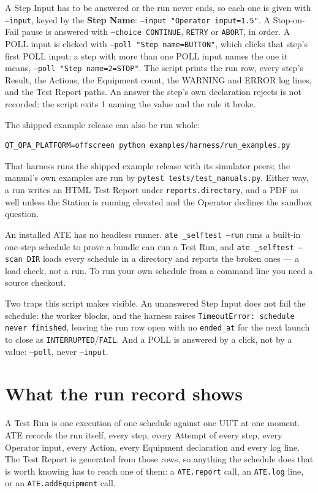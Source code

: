 A Step Input has to be answered or the run never ends, so each one is given with
\texttt{--input}, keyed by the \textbf{Step Name}: \texttt{--input "Operator input=1.5"}. A
Stop-on-Fail pause is answered with \texttt{--choice CONTINUE}, \texttt{RETRY} or
\texttt{ABORT}, in order. A POLL input is clicked with \texttt{--poll "Step name=BUTTON"}, which
clicks that step's first POLL input; a step with more than one POLL input names the one it means,
\texttt{--poll "Step name=2=STOP"}.
The script prints the run row, every step's Result, the Actions, the Equipment count, the
WARNING and ERROR log lines, and the Test Report paths. An answer the step's own declaration
rejects is not recorded: the script exits 1 naming the value and the rule it broke.

The shipped example release can also be run whole:

\begin{lstlisting}[language=ATEShell]
QT_QPA_PLATFORM=offscreen python examples/harness/run_examples.py
\end{lstlisting}

That harness runs the shipped example release with its simulator peers; the manual's own
examples are run by \texttt{pytest tests/test\_manuals.py}. Either way, a run writes an HTML
Test Report under \texttt{reports.directory}, and a PDF as well unless the Station is running
elevated and the Operator declines the sandbox question.

An installed ATE has no headless runner. \texttt{ate \_selftest --run} runs a built-in one-step
schedule to prove a bundle can run a Test Run, and \texttt{ate \_selftest --scan DIR} loads
every schedule in a directory and reports the broken ones --- a load check, not a run. To run
your own schedule from a command line you need a source checkout.

Two traps this script makes visible. An unanswered Step Input does not fail the schedule: the
worker blocks, and the harness raises \texttt{TimeoutError: schedule never finished}, leaving
the run row open with no \texttt{ended\_at} for the next launch to close as
\texttt{INTERRUPTED}/\texttt{FAIL}. And a POLL is answered by a click, not by a value:
\texttt{--poll}, never \texttt{--input}.

\section{What the run record shows}

A Test Run is one execution of one schedule against one UUT at one moment. ATE records the run
itself, every step, every Attempt of every step, every Operator input, every Action, every
Equipment declaration and every log line. The Test Report is generated from those rows, so
anything the schedule does that is worth knowing has to reach one of them: a
\texttt{ATE.report} call, an \texttt{ATE.log} line, or an \texttt{ATE.addEquipment} call.

